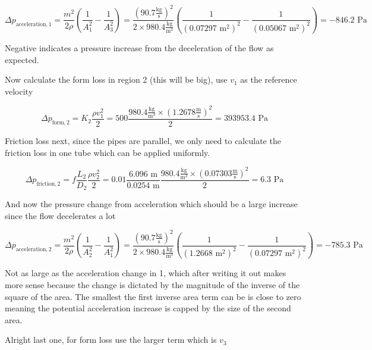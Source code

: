\documentclass{article}
\begin{document}
\begin{equation}
    \Delta p_{\text{acceleration},1} = \frac{m^2}{2 \rho} (\frac{1}{A_1^2} - \frac{1}{A_3^2}) = \frac{(90.7 \frac{\text{kg}}{\text{s}})^2}{2 \times 980.4 \frac{\text{kg}}{\text{m}^3}}(\frac{1}{(0.07297 \text{ m}^2)^2} - \frac{1}{(0.05067 \text{ m}^2)^2}) = -846.2 \text{ Pa}
\end{equation}

Negative indicates a pressure increase from the deceleration of the flow as expected.

Now calculate the form loss in region 2 (this will be big), use $v_1$ as the reference velocity

\begin{equation}
    \Delta p_{\text{form},2} = K_2 \frac{\rho v_{1}^2}{2} = 500 \frac{980.4 \frac{\text{kg}}{\text{m}^3} \times (1.2678 \frac{\text{m}}{\text{s}})^2}{2} = 393953.4 \text{ Pa}
\end{equation}

Friction loss next, since the pipes are parallel, we only need to calculate the friction loss in one tube which can be applied uniformly.

\begin{equation}
    \Delta p_{\text{friction},2} = f \frac{L_2}{D_2} \frac{\rho v_2^2}{2} = 0.01 \frac{6.096 \text{ m}}{0.0254 \text{ m}} \frac{980.4 \frac{\text{kg}}{\text{m}^3} \times (0.07303 \frac{\text{m}}{\text{s}} )^2}{2} = 6.3 \text{ Pa}
\end{equation}

And now the pressure change from acceleration which should be a large increase since the flow decelerates a lot

\begin{equation}
    \Delta p_{\text{acceleration},2} = \frac{m^2}{2 \rho} (\frac{1}{A_2^2} - \frac{1}{A_1^2}) = \frac{(90.7 \frac{\text{kg}}{\text{s}})^2}{2 \times 980.4 \frac{\text{kg}}{\text{m}^3}}(\frac{1}{(1.2668 \text{ m}^2)^2} - \frac{1}{(0.07297 \text{ m}^2)^2}) = -785.3 \text{ Pa}
\end{equation}

Not as large as the acceleration change in 1, which after writing it out makes more sense because the change is dictated by the magnitude of the inverse of the square of the area. The smallest the first inverse area term can be is close to zero meaning the potential acceleration increase is capped by the size of the second area.

Alright last one, for form loss use the larger term which is $v_3$
\end{document}
